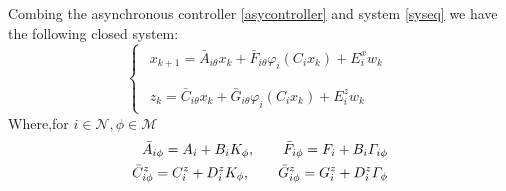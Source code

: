 \documentclass[conference]{IEEEtran}
\begin{document}
Combing the asynchronous controller \eqref{asycontroller} and system \eqref{syseq} we have the following closed system:
\begin{equation}\label{close_system_equation_2}
\left\{
\begin{array}{lr}
\begin{split}
x_{k+1}=\bar{A}_{i\theta}x_k+\bar{F}_{i\theta}\varphi_{i}(C_ix_k)+E_i^xw_k\\
\end{split}
\\
\begin{split}
z_k=\bar{C}_{i\theta}x_k+\bar{G}_{i\theta}\varphi_{i}(C_ix_k)+E^z_iw_k
\end{split}
\end{array}
\right.
\end{equation} 
Where,for $i \in \mathcal{N}, \phi \in \mathcal{M}$
\begin{equation} \notag
\begin{aligned}
\bar{A}_{i\phi}=A_{i}+B_{i}K_{\phi},  \qquad \bar{F}_{i\phi}=F_{i}+B_{i}\varGamma_{i\phi} \\
\bar{C}^{z}_{i\phi}=C^{z}_{i}+D^{z}_{i}K_{\phi}, \qquad \bar{G}^{z}_{i\phi}=G^{z}_{i}+D^{z}_{i}\varGamma_{\phi}
\end{aligned}
\end{equation}
\end{document}
